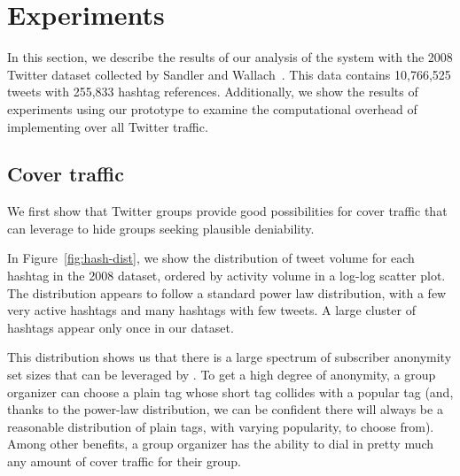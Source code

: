 \section{Experiments}
\label{sec:experiments}

In this section, we describe the results of our analysis of the \hoot
system with the 2008 Twitter dataset collected by Sandler and
Wallach~\cite{sandler09}. This data contains 10,766,525 tweets with
255,833 hashtag references. Additionally, we show the results of
experiments using our prototype to examine the computational overhead of
implementing \hoot over all Twitter traffic.

\subsection{Cover traffic}
We first show that Twitter groups provide good possibilities for cover
traffic that \hoot can leverage to hide groups seeking plausible
deniability.

In Figure~\ref{fig:hash-dist}, we show the distribution of 
tweet volume for each hashtag in the 2008 dataset, ordered by activity
volume in a log-log scatter plot. The
distribution appears to follow a standard power law distribution, with a
few very active hashtags and many hashtags with few tweets. A large
cluster of hashtags appear only once in our dataset. 

This distribution shows us that there is a large spectrum of subscriber
anonymity set sizes that can be leveraged by \hoot. To get a high
degree of anonymity, a group organizer can choose a plain tag whose short tag
collides with a popular tag (and, thanks to the power-law
distribution, we can be confident there will always be a reasonable
distribution of plain tags, with varying popularity, to choose from).
Among other benefits, a group organizer has the ability to dial in
pretty much any amount of cover traffic for their group.


